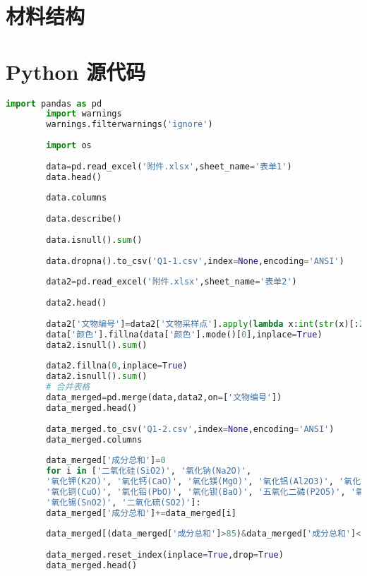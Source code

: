 \begin{appendices}
	\section{材料结构}
	\begin{table}[!htbp]
		\centering
	\end{table}
	
	\section{Python 源代码}
	\begin{lstlisting}[language=python]
		import pandas as pd
		import warnings
		warnings.filterwarnings('ignore')
		
		import os
		
		data=pd.read_excel('附件.xlsx',sheet_name='表单1')
		data.head()
		
		data.columns
		
		data.describe()
		
		data.isnull().sum()
		
		data.dropna().to_csv('Q1-1.csv',index=None,encoding='ANSI')
		
		data2=pd.read_excel('附件.xlsx',sheet_name='表单2')
		
		data2.head()
		
		data2['文物编号']=data2['文物采样点'].apply(lambda x:int(str(x)[:2]))
		data['颜色'].fillna(data['颜色'].mode()[0],inplace=True)
		data2.isnull().sum()
		
		data2.fillna(0,inplace=True)
		data2.isnull().sum()
		# 合并表格
		data_merged=pd.merge(data,data2,on=['文物编号'])
		data_merged.head()
		
		data_merged.to_csv('Q1-2.csv',index=None,encoding='ANSI')
		data_merged.columns
		
		data_merged['成分总和']=0
		for i in ['二氧化硅(SiO2)', '氧化钠(Na2O)',
		'氧化钾(K2O)', '氧化钙(CaO)', '氧化镁(MgO)', '氧化铝(Al2O3)', '氧化铁(Fe2O3)',
		'氧化铜(CuO)', '氧化铅(PbO)', '氧化钡(BaO)', '五氧化二磷(P2O5)', '氧化锶(SrO)',
		'氧化锡(SnO2)', '二氧化硫(SO2)']:
		data_merged['成分总和']+=data_merged[i]
		
		data_merged[(data_merged['成分总和']>85)&data_merged['成分总和']<105]
		
		data_merged.reset_index(inplace=True,drop=True)
		data_merged.head()
		
	\end{lstlisting}
\end{appendices}